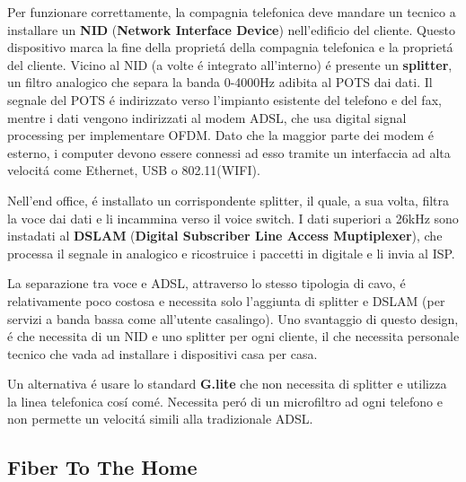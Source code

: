 \documentclass[../ComputerNetworks.tex]{subfiles}
\begin{document}
Per funzionare correttamente, la compagnia telefonica deve mandare un tecnico a installare un \textbf{NID} (\textbf{Network Interface Device}) nell’edificio del cliente.
Questo dispositivo marca la fine della proprietá della compagnia telefonica e la proprietá del cliente.
Vicino al NID (a volte é integrato all’interno) é presente un \textbf{splitter}, un filtro analogico che separa la banda 0-4000Hz adibita al POTS dai dati.
Il segnale del POTS é indirizzato verso l’impianto esistente del telefono e del fax, mentre i dati vengono indirizzati al modem ADSL, che usa digital signal processing per implementare OFDM.
Dato che la maggior parte dei modem é esterno, i computer devono essere connessi ad esso tramite un interfaccia ad alta velocitá come Ethernet, USB o 802.11(WIFI).

Nell’end office, é installato un corrispondente splitter, il quale, a sua volta, filtra la voce dai dati e li incammina verso il voice switch.
I dati superiori a 26kHz sono instadati al \textbf{DSLAM} (\textbf{Digital Subscriber Line Access Muptiplexer}), che processa il segnale in analogico e ricostruice i paccetti in digitale e li invia al ISP.

La separazione tra voce e ADSL, attraverso lo stesso tipologia di cavo, é relativamente poco costosa e necessita solo l’aggiunta di splitter e DSLAM (per servizi a banda bassa come all’utente casalingo).
Uno svantaggio di questo design, é che necessita di un NID e uno splitter per ogni cliente, il che necessita personale tecnico che vada ad installare i dispositivi casa per casa.

Un alternativa é usare lo standard \textbf{G.lite} che non necessita di splitter e utilizza la linea telefonica cosí comé.
Necessita peró di un microfiltro ad ogni telefono e non permette un velocitá simili alla tradizionale ADSL.

\subsection{Fiber To The Home}





\biblio
\end{document}
